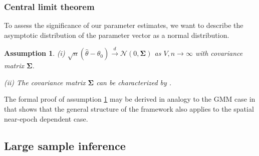 \documentclass[12pt]{article}
\newtheorem{assume}{Assumption}
\begin{document}
\subsubsection{Central limit theorem}
To assess the significance of our parameter estimates, we want to describe the asymptotic distribution of the parameter vector as a normal distribution.

\begin{assume}
	\label{as:clt}
	(i) $\sqrt{n}(\hat{\theta} - \theta_0) \overset{d}{\to} \mathcal{N}(0,\mathbf{\Sigma})$ as $V,n \to \infty$ with covariance matrix $\mathbf{\Sigma}$.
	
	(ii) The covariance matrix $\mathbf{\Sigma}$ can be characterized by \citet[Theorem 11.2.b, Theorem H.1]{PP97}.
\end{assume}

The formal proof of assumption \ref{as:clt} may be derived in analogy to the GMM case in \cite[Theorem 4]{JP12} that shows that the general structure of the \cite{PP97} framework also applies to the spatial near-epoch dependent case.



\subsection{Large sample inference}
\label{sec:asymptotic_inference}
\end{document}
